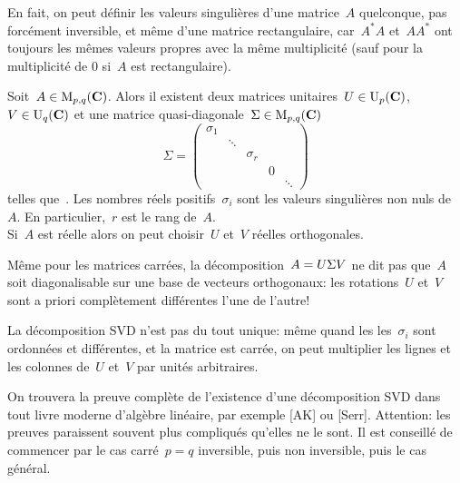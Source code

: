 En fait, on peut définir les valeurs singulières d'une matrice~$A$
quelconque, pas forcément inversible, et même d'une matrice rectangulaire,
car~$A^*A$ et~$AA^*$ ont toujours les mêmes valeurs propres avec la même
multiplicité (sauf pour la multiplicité de $0$ si~$A$ est rectangulaire).

\begin{theorem}
	\label{thm:svd}
	Soit~$A\in\mathrm{M}_{p,q}(\mathbf{C})$.  Alors il existent deux matrices unitaires~$U\in
	\mathrm{U}_p(\mathbf{C})$, $V\in\mathrm{U}_q(\mathbf{C})$ et une matrice quasi-diagonale~$\Sigma\in
	\mathrm{M}_{p,q}(\mathbf{C})$
	\[
		\Sigma = \begin{pmatrix}
			\sigma_1 & & & & \\
			 & \ddots & & & \\
			 & & \sigma_r & & \\
			 & & & 0 & \\
			 & & & & \ddots
		\end{pmatrix}
	\]
	telles que~.  Les nombres réels
	positifs~$\sigma_i$ sont les valeurs singulières non nuls de~$A$.  En
	particulier,~$r$ est le rang de~$A$. \\
	Si~$A$ est réelle alors on peut choisir~$U$ et~$V$ réelles orthogonales.
\end{theorem}

\begin{remark}
	Même pour les matrices carrées, la décomposition~$A=U\/\Sigma V$ ne dit pas
	que~$A$ soit diagonalisable sur une base de vecteurs orthogonaux: les
	rotations~$U$ et~$V$ sont a priori complètement différentes l'une de l'autre!
\end{remark}

\begin{remark}
	La décomposition SVD n'est pas du tout unique: même quand les
	les~$\sigma_i$ sont ordonnées et différentes, et la matrice est carrée, on
	peut multiplier les lignes et les colonnes de~$U$ et~$V$ par unités
	arbitraires.
\end{remark}

On trouvera la preuve complète de l'existence d'une décomposition SVD dans
tout livre moderne d'algèbre linéaire, par exemple [AK] ou [Serr].
Attention: les preuves paraissent souvent plus compliqués qu'elles ne le
sont.  Il est conseillé de commencer par le cas carré~$p=q$ inversible, puis
non inversible, puis le cas général.

